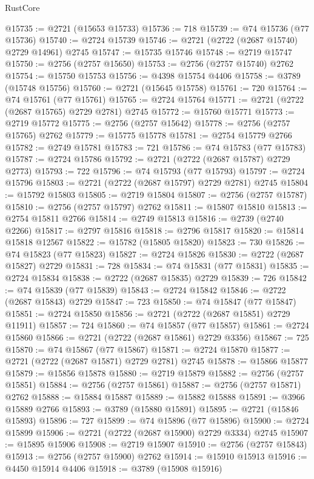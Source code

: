 \begin{lexlean}{RustCore}
\begin{coremodule}
@15735 := @2721 (@15653 @15733)
@15736 := 718
@15739 := @74 @15736 (@77 @15736)
@15740 := @2724 @15739
@15746 := @2721 (@2722 (@2687 @15740) @2729 @14961) @2745
@15747 := @15735 @15746
@15748 := @2719 @15747
@15750 := @2756 (@2757 @15650)
@15753 := @2756 (@2757 @15740) @2762
@15754 := @15750 @15753
@15756 := @4398 @15754 @4406
@15758 := @3789 (@15748 @15756)
@15760 := @2721 (@15645 @15758)
@15761 := 720
@15764 := @74 @15761 (@77 @15761)
@15765 := @2724 @15764
@15771 := @2721 (@2722 (@2687 @15765) @2729 @2781) @2745
@15772 := @15760 @15771
@15773 := @2719 @15772
@15775 := @2756 (@2757 @15642)
@15778 := @2756 (@2757 @15765) @2762
@15779 := @15775 @15778
@15781 := @2754 @15779 @2766
@15782 := @2749 @15781
@15783 := 721
@15786 := @74 @15783 (@77 @15783)
@15787 := @2724 @15786
@15792 := @2721 (@2722 (@2687 @15787) @2729 @2773)
@15793 := 722
@15796 := @74 @15793 (@77 @15793)
@15797 := @2724 @15796
@15803 := @2721 (@2722 (@2687 @15797) @2729 @2781) @2745
@15804 := @15792 @15803
@15805 := @2719 @15804
@15807 := @2756 (@2757 @15787)
@15810 := @2756 (@2757 @15797) @2762
@15811 := @15807 @15810
@15813 := @2754 @15811 @2766
@15814 := @2749 @15813
@15816 := @2739 (@2740 @2266)
@15817 := @2797 @15816
@15818 := @2796 @15817
@15820 := @15814 @15818 @12567
@15822 := @15782 (@15805 @15820)
@15823 := 730
@15826 := @74 @15823 (@77 @15823)
@15827 := @2724 @15826
@15830 := @2722 (@2687 @15827) @2729
@15831 := 728
@15834 := @74 @15831 (@77 @15831)
@15835 := @2724 @15834
@15838 := @2722 (@2687 @15835) @2729
@15839 := 726
@15842 := @74 @15839 (@77 @15839)
@15843 := @2724 @15842
@15846 := @2722 (@2687 @15843) @2729
@15847 := 723
@15850 := @74 @15847 (@77 @15847)
@15851 := @2724 @15850
@15856 := @2721 (@2722 (@2687 @15851) @2729 @11911)
@15857 := 724
@15860 := @74 @15857 (@77 @15857)
@15861 := @2724 @15860
@15866 := @2721 (@2722 (@2687 @15861) @2729 @3356)
@15867 := 725
@15870 := @74 @15867 (@77 @15867)
@15871 := @2724 @15870
@15877 := @2721 (@2722 (@2687 @15871) @2729 @2781) @2745
@15878 := @15866 @15877
@15879 := @15856 @15878
@15880 := @2719 @15879
@15882 := @2756 (@2757 @15851)
@15884 := @2756 (@2757 @15861)
@15887 := @2756 (@2757 @15871) @2762
@15888 := @15884 @15887
@15889 := @15882 @15888
@15891 := @3966 @15889 @2766
@15893 := @3789 (@15880 @15891)
@15895 := @2721 (@15846 @15893)
@15896 := 727
@15899 := @74 @15896 (@77 @15896)
@15900 := @2724 @15899
@15906 := @2721 (@2722 (@2687 @15900) @2729 @3334) @2745
@15907 := @15895 @15906
@15908 := @2719 @15907
@15910 := @2756 (@2757 @15843)
@15913 := @2756 (@2757 @15900) @2762
@15914 := @15910 @15913
@15916 := @4450 @15914 @4406
@15918 := @3789 (@15908 @15916)

\end{coremodule}
\end{lexlean}
